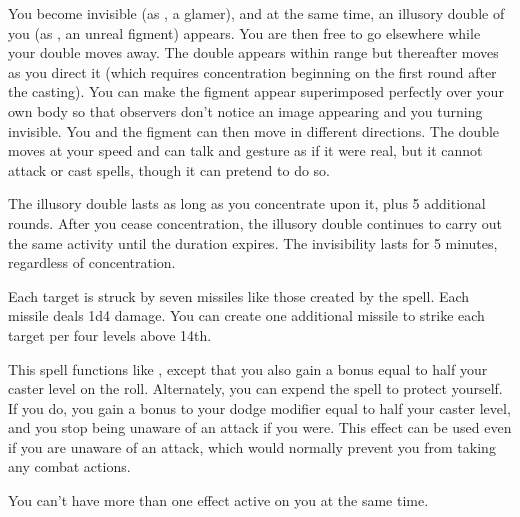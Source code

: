 \begin{spelleffect}
  You become invisible (as , a glamer), and at the same time, an illusory double of you (as , an unreal figment) appears. You are then free to go elsewhere while your double moves away. The double appears within range but thereafter moves as you direct it (which requires concentration beginning on the first round after the casting). You can make the figment appear superimposed perfectly over your own body so that observers don't notice an image appearing and you turning invisible. You and the figment can then move in different directions. The double moves at your speed and can talk and gesture as if it were real, but it cannot attack or cast spells, though it can pretend to do so.
  \par The illusory double lasts as long as you concentrate upon it, plus 5 additional rounds. After you cease concentration, the illusory double continues to carry out the same activity until the duration expires. The invisibility lasts for 5 minutes, regardless of concentration.
\end{spelleffect}

\begin{spelleffect}
  Each target is struck by seven missiles like those created by the  spell. Each missile deals 1d4 damage. You can create one additional missile to strike each target per four levels above 14th.
\end{spelleffect}

\begin{spelleffect}
  This spell functions like , except that you also gain a bonus equal to half your caster level on the roll. Alternately, you can expend the spell to protect yourself. If you do, you gain a bonus to your dodge modifier equal to half your caster level, and you stop being unaware of an attack if you were. This effect can be used even if you are unaware of an attack, which would normally prevent you from taking any combat actions.
\end{spelleffect}
\begin{spellnotes}
  You can't have more than one  effect active on you at the same time.
\end{spellnotes}


